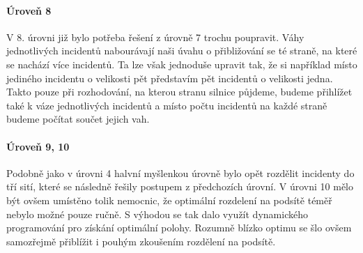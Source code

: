 \documentclass[12pt,a4paper]{article}
\begin{document}
\paragraph*{Úroveň 8}
V 8. úrovni již bylo potřeba řešení z úrovně 7 trochu poupravit. Váhy jednotlivých incidentů nabourávají naši úvahu o přibližování se té straně, na které se nachází více incidentů.
Ta lze však jednoduše upravit tak, že si například místo jediného incidentu o velikosti pět představím pět incidentů o velikosti jedna. Takto pouze při rozhodování, na kterou stranu silnice půjdeme, budeme přihlížet také k váze jednotlivých incidentů a místo počtu incidentů na každé straně budeme počítat součet jejich vah.

\paragraph*{Úroveň 9, 10}
Podobně jako v úrovni 4 halvní myšlenkou úrovně bylo opět rozdělit incidenty do tří sití, které se následně řešily postupem z předchozích úrovní. V úrovni 10 mělo být ovšem umístěno tolik nemocnic, že optimální rozdelení na podsítě téměř nebylo možné pouze ručně. S výhodou se tak dalo využít dynamického programování pro získání optimální polohy. Rozumně blízko optimu se šlo ovšem samozřejmě přiblížit i pouhým zkoušením rozdělení na podsítě.
\end{document}
